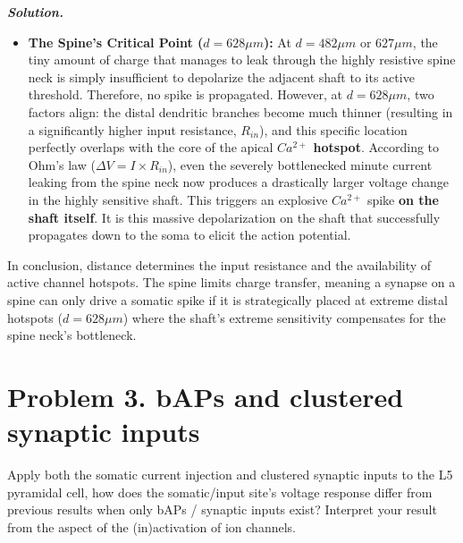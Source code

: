 \documentclass{article}
\newenvironment{solution}{%
    \par\noindent\begin{solutionbox}\textbf{\textit{Solution.}}\par\medskip\itshape
}{%
    \end{solutionbox}
}
\begin{document}
\begin{solution}
\begin{itemize}
    \item \textbf{The Spine's Critical Point ($d=628\mu m$):} 
    At $d=482\mu m$ or $627\mu m$, the tiny amount of charge that manages to leak through the highly resistive spine neck is simply insufficient to depolarize the adjacent shaft to its active threshold. Therefore, no spike is propagated. 
    However, at $d=628\mu m$, two  factors align: the distal dendritic branches become much thinner (resulting in a significantly higher input resistance, $R_{in}$), and this specific location perfectly overlaps with the core of the apical \textbf{$Ca^{2+}$ hotspot}. According to Ohm's law ($\Delta V = I \times R_{in}$), even the severely bottlenecked minute current leaking from the spine neck now produces a drastically larger voltage change in the highly sensitive shaft. This triggers an explosive $Ca^{2+}$ spike \textbf{on the shaft itself}. It is this massive depolarization on the shaft that successfully propagates down to the soma to elicit the action potential.
\end{itemize}

In conclusion, distance determines the input resistance and the availability of active channel hotspots. The spine limits charge transfer, meaning a synapse on a spine can only drive a somatic spike if it is strategically placed at extreme distal hotspots ($d=628\mu m$) where the shaft's extreme sensitivity compensates for the spine neck's bottleneck.
\end{solution}
\clearpage

\section*{\textbf{Problem 3.} bAPs and clustered synaptic inputs}

Apply both the somatic current injection and clustered synaptic inputs to the L5 pyramidal cell, how does the somatic/input site's voltage response differ from previous results when only bAPs / synaptic inputs exist? Interpret your result from the aspect of the (in)activation of ion channels.
\end{document}
